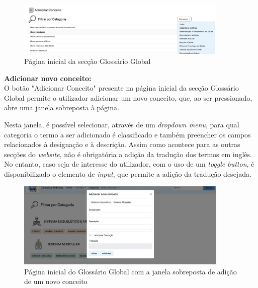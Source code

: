 \begin{figure}[H]
    \centering
    \centering
    \includegraphics[width=0.9\textwidth]
    {Images/pagina_inicial_gloss.png}
    \caption{Página inicial da secção Glossário Global}
    \label{fig:dic-traduc1}
\end{figure}

\textbf{Adicionar novo conceito:}\\

O botão "Adicionar Conceito" presente na página inicial da secção Glossário Global permite o utilizador adicionar um novo conceito, que, ao ser pressionado, abre uma janela sobreposta à página.

Nesta janela, é possível selecionar, através de um \textit{dropdown menu}, para qual categoria o termo a ser adicionado é classificado e também preencher os campos relacionados à designação e à descrição. Assim como acontece para as outras secções do \textit{website}, não é obrigatória a adição da tradução dos termos em inglês. No entanto, caso seja de interesse do utilizador, com o uso de um \textit{toggle button}, é disponibilizado o elemento de \textit{input}, que permite a adição da tradução desejada.

\begin{figure}[H]
    \centering
    \centering
    \includegraphics[width=0.9\textwidth]
    {Images/novo_glossario.png}
    \caption{Página inicial do Glossário Global com a janela sobreposta de adição de um novo conceito}
    \label{fig:dic-traduc1}
\end{figure}

 \newpage



